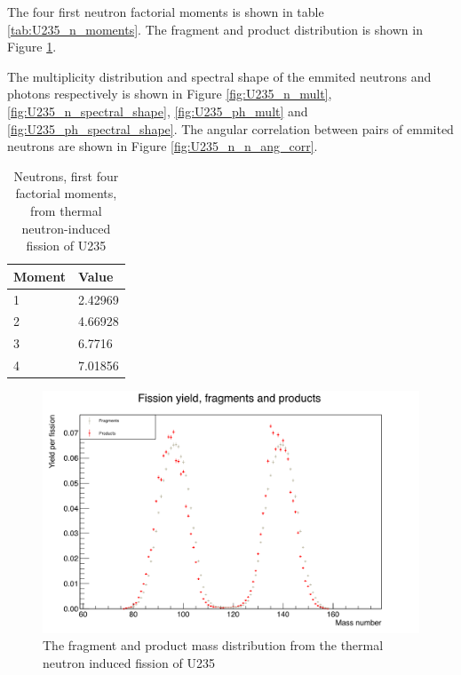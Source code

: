 \documentclass[]{article}
\begin{document}
The four first neutron factorial moments is shown in table \ref{tab:U235_n_moments}. The fragment and product distribution is shown in Figure \ref{fig:U235_fragment_product_distribution}. 

The multiplicity distribution and spectral shape of the emmited neutrons and photons respectively is shown in Figure \ref{fig:U235_n_mult}, \ref{fig:U235_n_spectral_shape}, \ref{fig:U235_ph_mult} and \ref{fig:U235_ph_spectral_shape}. The angular correlation between pairs of emmited neutrons are shown in Figure \ref{fig:U235_n_n_ang_corr}.

\begin{table} [H]
	\centering
	\caption{Neutrons, first four factorial moments, from thermal neutron-induced fission of U235 }
	\begin{tabularx}{\textwidth}{XX} \hline
		\label{U235_n_moments}
		Moment & Value \\ \hline
		1 & 2.42969 \\
		2 & 4.66928\\
		3 & 6.7716\\
		4 & 7.01856\\ 
	\end{tabularx}
\end{table}

\begin{figure} [H]
	\centering
	\includegraphics[scale=0.36]{U235_fragment_product_distribution.png}
	\caption{The fragment and product mass distribution from the thermal neutron induced fission of U235}
	\label{fig:U235_fragment_product_distribution}
\end{figure}
\end{document}
